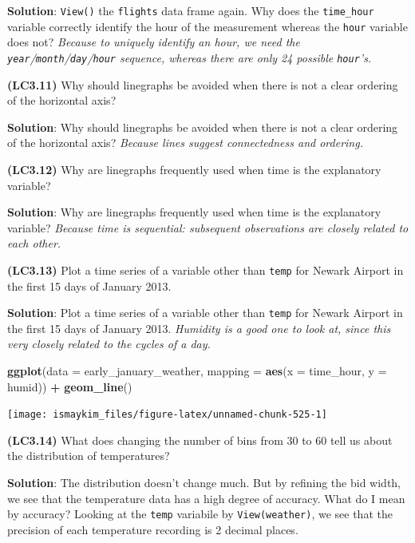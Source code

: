 \documentclass[12pt,]{krantz}
\makeatletter
\newenvironment{Shaded}{\begin{snugshade}}{\end{snugshade}}
\newcommand{\KeywordTok}[1]{\textcolor[rgb]{0.27,0.27,0.27}{\textbf{#1}}}
\newcommand{\DataTypeTok}[1]{\textcolor[rgb]{0.27,0.27,0.27}{#1}}
\newcommand{\StringTok}[1]{\textcolor[rgb]{0.5,0.5,0.5}{#1}}
\newcommand{\OperatorTok}[1]{\textcolor[rgb]{0.43,0.43,0.43}{\textbf{#1}}}
\newcommand{\NormalTok}[1]{#1}
\newenvironment{kframe}{%
\medskip{}
\setlength{\fboxsep}{.8em}
 \def\at@end@of@kframe{}%
 \ifinner\ifhmode%
  \def\at@end@of@kframe{\end{minipage}}%
  \begin{minipage}{\columnwidth}%
 \fi\fi%
 \def\FrameCommand##1{\hskip\@totalleftmargin \hskip-\fboxsep
 \colorbox{shadecolor}{##1}\hskip-\fboxsep
     \hskip-\linewidth \hskip-\@totalleftmargin \hskip\columnwidth}%
 \MakeFramed {\advance\hsize-\width
   \@totalleftmargin\z@ \linewidth\hsize
   \@setminipage}}%
 {\par\unskip\endMakeFramed%
 \at@end@of@kframe}
\renewenvironment{Shaded}{\begin{kframe}}{\end{kframe}}
\makeatother
\begin{document}
\textbf{Solution}: \texttt{View()} the \texttt{flights} data frame
again. Why does the \texttt{time\_hour} variable correctly identify the
hour of the measurement whereas the \texttt{hour} variable does not?
\emph{Because to uniquely identify an hour, we need the
\texttt{year}/\texttt{month}/\texttt{day}/\texttt{hour} sequence,
whereas there are only 24 possible \texttt{hour}'s.}

\textbf{(LC3.11)} Why should linegraphs be avoided when there is not a
clear ordering of the horizontal axis?

\textbf{Solution}: Why should linegraphs be avoided when there is not a
clear ordering of the horizontal axis? \emph{Because lines suggest
connectedness and ordering.}

\textbf{(LC3.12)} Why are linegraphs frequently used when time is the
explanatory variable?

\textbf{Solution}: Why are linegraphs frequently used when time is the
explanatory variable? \emph{Because time is sequential: subsequent
observations are closely related to each other.}

\textbf{(LC3.13)} Plot a time series of a variable other than
\texttt{temp} for Newark Airport in the first 15 days of January 2013.

\textbf{Solution}: Plot a time series of a variable other than
\texttt{temp} for Newark Airport in the first 15 days of January 2013.
\emph{Humidity is a good one to look at, since this very closely related
to the cycles of a day.}

\begin{Shaded}
\begin{Highlighting}[]
\KeywordTok{ggplot}\NormalTok{(}\DataTypeTok{data =}\NormalTok{ early_january_weather, }\DataTypeTok{mapping =} \KeywordTok{aes}\NormalTok{(}\DataTypeTok{x =}\NormalTok{ time_hour, }\DataTypeTok{y =}\NormalTok{ humid)) }\OperatorTok{+}
\StringTok{  }\KeywordTok{geom_line}\NormalTok{()}
\end{Highlighting}
\end{Shaded}

\begin{center}\texttt{[image: ismaykim\_files/figure-latex/unnamed-chunk-525-1]} \end{center}

\textbf{(LC3.14)} What does changing the number of bins from 30 to 60
tell us about the distribution of temperatures?

\textbf{Solution}: The distribution doesn't change much. But by refining
the bid width, we see that the temperature data has a high degree of
accuracy. What do I mean by accuracy? Looking at the \texttt{temp}
variabile by \texttt{View(weather)}, we see that the precision of each
temperature recording is 2 decimal places.
\end{document}
